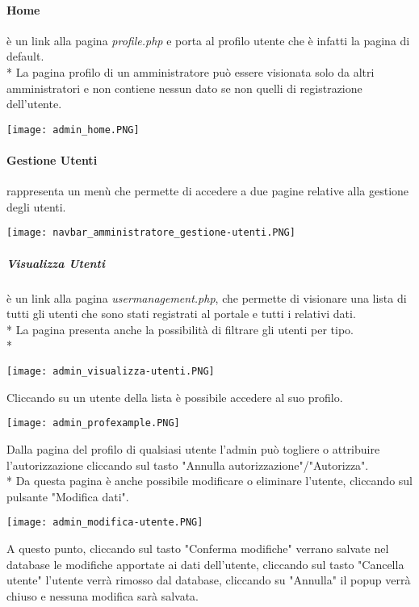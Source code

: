 \documentclass[12pt]{article}
\begin{document}
\paragraph{Home} è un link alla pagina \textit{profile.php} e porta al profilo utente che è infatti la pagina di default.\\*
La pagina profilo di un amministratore può essere visionata solo da altri amministratori e non contiene nessun dato se non quelli di registrazione dell'utente.
\begin{center}
    \texttt{[image: admin\_home.PNG]}
\end{center}
\bigskip
\paragraph{Gestione Utenti} rappresenta un menù che permette di accedere a due pagine relative alla gestione degli utenti.
\begin{center}
    \texttt{[image: navbar\_amministratore\_gestione-utenti.PNG]}
\end{center}
\subparagraph{Visualizza Utenti} è un link alla pagina \textit{usermanagement.php}, che permette di visionare una lista di tutti gli utenti che sono stati registrati al portale e tutti i relativi dati.\\*
La pagina presenta anche la possibilità di filtrare gli utenti per tipo.\\*

\begin{center}
    \texttt{[image: admin\_visualizza-utenti.PNG]}
\end{center}

Cliccando su un utente della lista è possibile accedere al suo profilo.
\begin{center}
    \texttt{[image: admin\_profexample.PNG]}
\end{center}

Dalla pagina del profilo di qualsiasi utente l'admin può togliere o attribuire l'autorizzazione cliccando sul tasto "Annulla autorizzazione"/"Autorizza".\\*
Da questa pagina è anche possibile modificare o eliminare l'utente, cliccando sul pulsante "Modifica dati".
\begin{center}
    \texttt{[image: admin\_modifica-utente.PNG]}
\end{center}
A questo punto, cliccando sul tasto "Conferma modifiche" verrano salvate nel database le modifiche apportate ai dati dell'utente, cliccando sul tasto "Cancella utente" l'utente verrà rimosso dal database, cliccando su "Annulla" il popup verrà chiuso e nessuna modifica sarà salvata.
\end{document}
